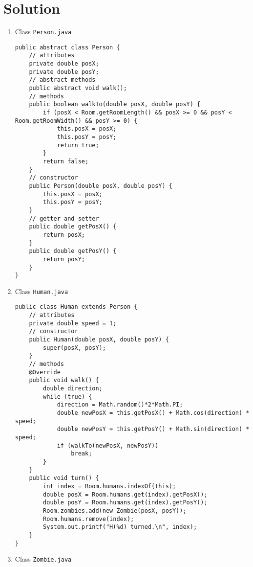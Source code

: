 \documentclass[12pt,letterpaper,twoside]{article}
\begin{document}
\section*{Solution}

\begin{enumerate}
\item Class \texttt{Person.java}

\lstset{language=java,tabsize=2}
\begin{lstlisting}
public abstract class Person {
	// attributes
	private double posX;
	private double posY;
	// abstract methods
	public abstract void walk();
	// methods
	public boolean walkTo(double posX, double posY) {
		if (posX < Room.getRoomLength() && posX >= 0 && posY < Room.getRoomWidth() && posY >= 0) {
			this.posX = posX;
			this.posY = posY;
			return true;
		}
		return false;
	}
	// constructor
	public Person(double posX, double posY) {
		this.posX = posX;
		this.posY = posY;
	}
	// getter and setter
	public double getPosX() {
		return posX;
	}
	public double getPosY() {
		return posY;
	}
}
\end{lstlisting}

\item Class \texttt{Human.java}

\lstset{language=java,tabsize=2}
\begin{lstlisting}
public class Human extends Person {
	// attributes
	private double speed = 1;
	// constructor
	public Human(double posX, double posY) {
		super(posX, posY);
	}
	// methods
	@Override
	public void walk() {
		double direction;
		while (true) {
			direction = Math.random()*2*Math.PI;
			double newPosX = this.getPosX() + Math.cos(direction) * speed;
			double newPosY = this.getPosY() + Math.sin(direction) * speed;
			if (walkTo(newPosX, newPosY))
				break;
		}
	}
	public void turn() {
		int index = Room.humans.indexOf(this);
		double posX = Room.humans.get(index).getPosX();
		double posY = Room.humans.get(index).getPosY();
		Room.zombies.add(new Zombie(posX, posY));
		Room.humans.remove(index);
		System.out.printf("H(%d) turned.\n", index);
	}
}
\end{lstlisting}

\item Class \texttt{Zombie.java}


\end{enumerate}
\end{document}
